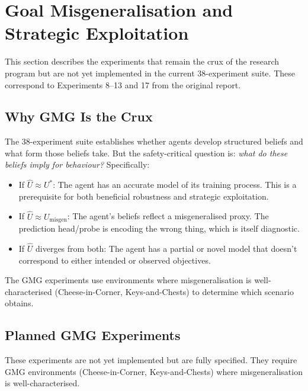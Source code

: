 \documentclass[11pt,a4paper]{article}
\theoremstyle{remark}
\newcommand{\Uhat}{\hat{U}}
\newcommand{\Ustar}{U^*}
\newcommand{\Umisgen}{U_{\text{misgen}}}
\begin{document}
\section{Goal Misgeneralisation and Strategic Exploitation}
\label{sec:gmg}

This section describes the experiments that remain the crux of the research program but are not yet implemented in the current 38-experiment suite. These correspond to Experiments 8--13 and 17 from the original report.

\subsection{Why GMG Is the Crux}

The 38-experiment suite establishes whether agents develop structured beliefs and what form those beliefs take. But the safety-critical question is: \textit{what do these beliefs imply for behaviour?} Specifically:

\begin{itemize}[nosep]
    \item If $\Uhat \approx \Ustar$: The agent has an accurate model of its training process. This is a prerequisite for both beneficial robustness and strategic exploitation.
    \item If $\Uhat \approx \Umisgen$: The agent's beliefs reflect a misgeneralised proxy. The prediction head/probe is encoding the wrong thing, which is itself diagnostic.
    \item If $\Uhat$ diverges from both: The agent has a partial or novel model that doesn't correspond to either intended or observed objectives.
\end{itemize}

The GMG experiments use environments where misgeneralisation is well-characterised (Cheese-in-Corner, Keys-and-Chests) to determine which scenario obtains.

\subsection{Planned GMG Experiments}

These experiments are not yet implemented but are fully specified. They require GMG environments (Cheese-in-Corner, Keys-and-Chests) where misgeneralisation is well-characterised.
\end{document}

